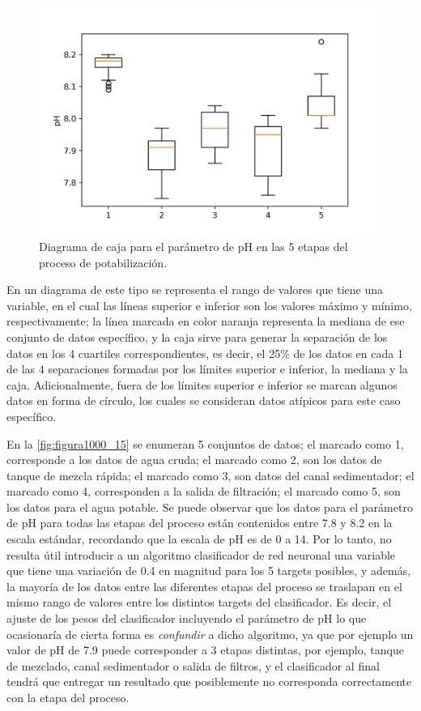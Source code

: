 \begin{figure}[h]
	\centering
	\includegraphics[scale=1.0]{imgss165.png}
	\caption{Diagrama de caja para el parámetro de pH en las 5 etapas del proceso de potabilización.}
	\label{fig:figura1000_15}
\end{figure}

En un diagrama de este tipo se representa el rango de valores que tiene una variable, en el cual las líneas superior e inferior son los valores máximo y mínimo, respectivamente; la línea marcada en color naranja representa 
la mediana de ese conjunto de datos específico, y la caja sirve para generar la separación de los datos en los 4 cuartiles correspondientes, es decir, el 25$\%$ de los datos en cada 1 de las 4 separaciones formadas por los 
límites superior e inferior, la mediana y la caja. Adicionalmente, fuera de los límites superior e inferior se marcan algunos datos en forma de círculo, los cuales se consideran datos atípicos para este caso específico.

En la \autoref{fig:figura1000_15} se enumeran 5 conjuntos de datos; el marcado como 1, corresponde a los datos de agua cruda; el marcado como 2, son los datos de tanque de mezcla rápida; el marcado como 3, son datos del 
canal sedimentador; el marcado como 4, corresponden a la salida de filtración; el marcado como 5, son los datos para el agua potable. Se puede observar que los datos para el parámetro de pH para todas las etapas del proceso 
están contenidos entre 7.8 y 8.2 en la escala estándar, recordando que la escala de pH es de 0 a 14. Por lo tanto, no resulta útil introducir a un algoritmo clasificador de red neuronal una variable que tiene una variación 
de 0.4 en magnitud para los 5 targets posibles, y además, la mayoría de los datos entre las diferentes etapas del proceso se traslapan en el mismo rango de valores entre los distintos targets del clasificador. Es decir, el 
ajuste de los pesos del clasificador incluyendo el parámetro de pH lo que ocasionaría de cierta forma es \textit{confundir} a dicho algoritmo, ya que por ejemplo un valor de pH de 7.9 puede corresponder a 3 etapas distintas,
por ejemplo, tanque de mezclado, canal sedimentador o salida de filtros, y el clasificador al final tendrá que entregar un resultado que posiblemente no corresponda correctamente con la etapa del proceso.


